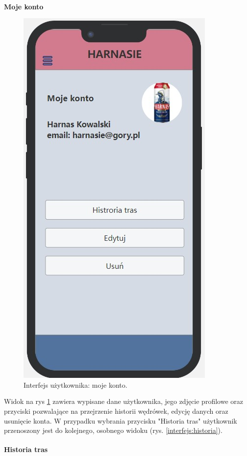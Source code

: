     \\
    \textbf{Moje konto} 
    \begin{figure}[H]
        \centering
        \includegraphics[scale=0.5]{img/interfejsy/if_konto.jpg}
        \caption{Interfejs użytkownika: moje konto.}
        \label{interfejs:konto}
    \end{figure}
    Widok na rys \ref{interfejs:konto} zawiera wypisane dane użytkownika, jego zdjęcie profilowe oraz przyciski pozwalające na przejrzenie historii wędrówek, edycję danych oraz usunięcie konta. W przypadku wybrania przycisku "Historia tras" użytkownik przenoszony jest do kolejnego, osobnego widoku (rys. \ref{interfejs:historia}). \\
    \\
    \textbf{Historia tras}
